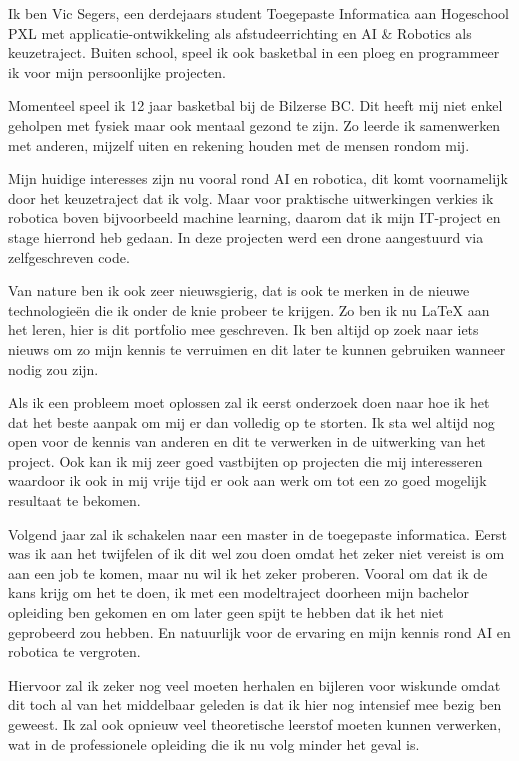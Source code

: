 

Ik ben Vic Segers, een derdejaars student Toegepaste Informatica aan Hogeschool PXL met applicatie\hyp{}ontwikkeling als afstudeerrichting en AI \& Robotics als keuzetraject. Buiten school, speel ik ook basketbal in een ploeg en programmeer ik voor mijn persoonlijke projecten.

Momenteel speel ik 12 jaar basketbal bij de Bilzerse BC. Dit heeft mij niet enkel geholpen met fysiek maar ook mentaal gezond te zijn. Zo leerde ik samenwerken met anderen, mijzelf uiten en rekening houden met de mensen rondom mij.

Mijn huidige interesses zijn nu vooral rond AI en robotica, dit komt voornamelijk door het keuzetraject dat ik volg. Maar voor praktische uitwerkingen verkies ik robotica boven bijvoorbeeld machine learning, daarom dat ik mijn IT\hyp{}project en stage hierrond heb gedaan. In deze projecten werd een drone aangestuurd via zelfgeschreven code.

Van nature ben ik ook zeer nieuwsgierig, dat is ook te merken in de nieuwe technologie\"en die ik onder de knie probeer te krijgen. Zo ben ik nu \LaTeX{} aan het leren, hier is dit portfolio mee geschreven. Ik ben altijd op zoek naar iets nieuws om zo mijn kennis te verruimen en dit later te kunnen gebruiken wanneer nodig zou zijn.

Als ik een probleem moet oplossen zal ik eerst onderzoek doen naar hoe ik het dat het beste aanpak om mij er dan volledig op te storten. Ik sta wel altijd nog open voor de kennis van anderen en dit te verwerken in de uitwerking van het project. Ook kan ik mij zeer goed vastbijten op projecten die mij interesseren waardoor ik ook in mij vrije tijd er ook aan werk om tot een zo goed mogelijk resultaat te bekomen.

Volgend jaar zal ik schakelen naar een master in de toegepaste informatica. Eerst was ik aan het twijfelen of ik dit wel zou doen omdat het zeker niet vereist is om aan een job te komen, maar nu wil ik het zeker proberen. Vooral om dat ik de kans krijg om het te doen, ik met een modeltraject doorheen mijn bachelor opleiding ben gekomen en om later geen spijt te hebben dat ik het niet geprobeerd zou hebben. En natuurlijk voor de ervaring en mijn kennis rond AI en robotica te vergroten.

Hiervoor zal ik zeker nog veel moeten herhalen en bijleren voor wiskunde omdat dit toch al van het middelbaar geleden is dat ik hier nog intensief mee bezig ben geweest. Ik zal ook opnieuw veel theoretische leerstof moeten kunnen verwerken, wat in de professionele opleiding die ik nu volg minder het geval is.